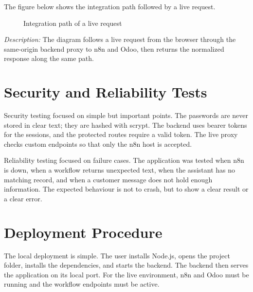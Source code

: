 \documentclass[12pt,a4paper,oneside]{report}
\newcommand{\figdesc}[1]{%
\vspace{-0.05cm}\noindent\small\textit{Description:} #1\par\normalsize\vspace{0.30cm}%
}
\begin{document}
The figure below shows the integration path followed by a live request.

\begin{figure}[H]
\centering
{}
\caption{Integration path of a live request}
\end{figure}
\figdesc{The diagram follows a live request from the browser through the same-origin backend proxy to n8n and Odoo, then returns the normalized response along the same path.}

\section{Security and Reliability Tests}\label{sumlbl:c9s5}
Security testing focused on simple but important points. The passwords are never stored in clear text; they are hashed with scrypt. The backend uses bearer tokens for the sessions, and the protected routes require a valid token. The live proxy checks custom endpoints so that only the n8n host is accepted.

Reliability testing focused on failure cases. The application was tested when n8n is down, when a workflow returns unexpected text, when the assistant has no matching record, and when a customer message does not hold enough information. The expected behaviour is not to crash, but to show a clear result or a clear error.

\section{Deployment Procedure}\label{sumlbl:c9s6}
The local deployment is simple. The user installs Node.js, opens the project folder, installs the dependencies, and starts the backend. The backend then serves the application on its local port. For the live environment, n8n and Odoo must be running and the workflow endpoints must be active.
\end{document}
